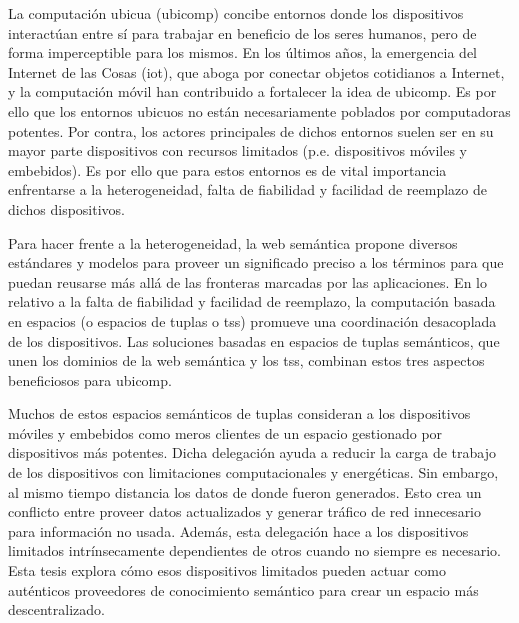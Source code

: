 \begin{resumen}        %
La computación ubicua (\acs{ubicomp}) concibe entornos donde los dispositivos interactúan entre sí para trabajar en beneficio de los seres humanos, pero de forma imperceptible para los mismos.
En los últimos años, la emergencia del Internet de las Cosas (\acs{iot}), que aboga por conectar objetos cotidianos a Internet, y la computación móvil han contribuido a fortalecer la idea de \ac{ubicomp}.
Es por ello que los entornos ubicuos no están necesariamente poblados por computadoras potentes.
Por contra, los actores principales de dichos entornos suelen ser en su mayor parte dispositivos con recursos limitados (p.e. dispositivos móviles y embebidos).
Es por ello que para estos entornos es de vital importancia enfrentarse a la heterogeneidad, falta de fiabilidad y facilidad de reemplazo de dichos dispositivos.


Para hacer frente a la heterogeneidad, la web semántica propone diversos estándares y modelos para proveer un significado preciso a los términos para que puedan reusarse más allá de las fronteras marcadas por las aplicaciones.
En lo relativo a la falta de fiabilidad y facilidad de reemplazo, la computación basada en espacios (o espacios de tuplas o \aclp{ts}) promueve una coordinación desacoplada de los dispositivos.
Las soluciones basadas en espacios de tuplas semánticos, que unen los dominios de la web semántica y los \aclp{ts}, combinan estos tres aspectos beneficiosos para \ac{ubicomp}.


Muchos de estos espacios semánticos de tuplas consideran a los dispositivos móviles y embebidos como meros clientes de un espacio gestionado por dispositivos más potentes.
Dicha delegación ayuda a reducir la carga de trabajo de los dispositivos con limitaciones computacionales y energéticas.
Sin embargo, al mismo tiempo distancia los datos de donde fueron generados.
Esto crea un conflicto entre proveer datos actualizados y generar tráfico de red innecesario para información no usada.
Además, esta delegación hace a los dispositivos limitados intrínsecamente dependientes de otros cuando no siempre es necesario.
Esta tesis explora cómo esos dispositivos limitados pueden actuar como auténticos proveedores de conocimiento semántico para crear un espacio más descentralizado.



\end{resumen}
